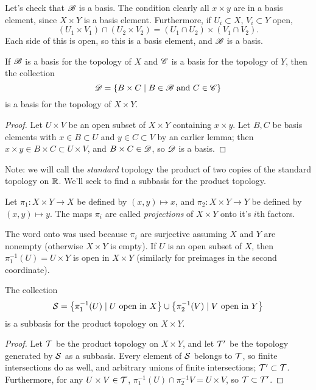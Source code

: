 \documentclass[10pt]{report}
\begin{document}
Let's check that $\mathscr{B}$ is a basis.
The condition clearly all $x \times y$ are in a basis element, since $X \times Y$ is a basis element.
Furthermore, if $U_i \subset X$, $V_i \subset Y$ open, 
\[
  (U_1 \times V_1) \cap (U_2 \times V_2)
  = (U_1 \cap U_2) \times (V_1 \cap V_2).
\]
Each side of this is open, so this is a basis element, and $\mathscr{B}$ is a basis.

\begin{theorem}
  If $\mathscr{B}$ is a basis for the topology of $X$ and $\mathscr{C}$ is a basis for the topology of $Y$, then the collection
  \[
    \mathscr{D} = \left\{ B \times C \mid B \in \mathscr{B} \text{ and } C \in \mathscr{C} \right\}
  \]
  is a basis for the topology of $X \times Y$.
\end{theorem}
\begin{proof}
  Let $U \times V$ be an open subset of $X \times Y$ containing $x \times y$.
  Let $B,C$ be basis elements with $x \in B \subset U$ and $y \in C \subset V$ by an earlier lemma; then $x \times y \in B \times C \subset U \times V$, and $B \times C \in \mathscr{D}$, so $\mathscr{D}$ is a basis.
\end{proof}

Note: we will call the \emph{standard} topology the product of two copies of the standard topology on $\mathbb{R}$.
We'll seek to find a subbasis for the product topology.
\begin{definition}
  Let $\pi_1:X \times Y \rightarrow X$ be defined by $(x,y) \mapsto x$, and $\pi_2:X \times Y \rightarrow Y$ be defined by $(x,y) \mapsto y$.
  The maps $\pi_i$ are called \emph{projections} of $X \times Y$ onto it's $i$th factors.
\end{definition}

The word onto was used because $\pi_i$ are surjective assuming $X$ and $Y$ are nonempty (otherwise $X \times Y$ is empty).
If $U$ is an open subset of $X$, then $\pi_1^{-1}(U) = U \times Y$ is open in $X \times Y$ (similarly for preimages in the second coordinate).

\begin{theorem}
  The collection
  \[
    \mathcal{S} = \left\{  \pi_1^{-1}(U) \mid U \text{ open in } X  \right\} \cup \left\{  \pi_2^{-1}(V) \mid V \text{ open in } Y \right\}
  \]
  is a subbasis for the product topology on $X \times Y$.
\end{theorem}
\begin{proof}
  Let $\mathcal{T}$ be the product topology on $X \times Y$, and let $\mathcal{T}'$ be the topology generated by $\mathcal{S}$ as a subbasis.
  Every element of $\mathcal{S}$ belongs to $\mathcal{T}$, so finite intersections do as well, and arbitrary unions of finite intersections; $\mathcal{T}' \subset \mathcal{T}$.
  Furthermore, for any $U \times V \in \mathcal{T}$, $\pi_1^{-1}(U) \cap \pi_2^{-1}V = U \times V$, so $\mathcal{T} \subset \mathcal{T}'$.
\end{proof}
\end{document}
